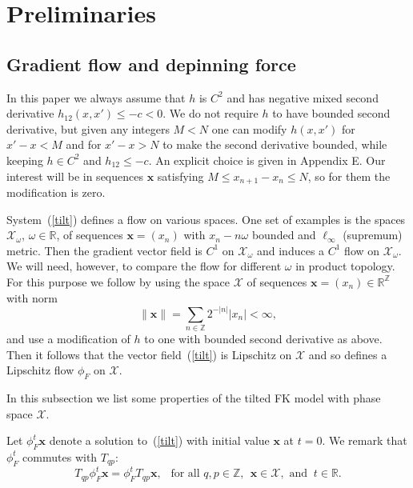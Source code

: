 \documentclass[12pt]{article}
\newcommand{\R}{\mathbb{R}}
\newcommand{\Z}{\mathbb{Z}}
\newcounter{number}
\newcommand{\begeq}{\begin{equation}}
\newcommand{\eeq}{\end{equation}}
\newcommand{\newsection}[1]{    \section{#1}
                               \setcounter{equation}{0}
                                \setcounter{number}{1} }
\newcommand{\refer}[1]{~(\ref{#1})}
\newcommand{\xbf}{{\mathbf{x}}}
\begin{document}

\newsection{Preliminaries}\label{sec:pre}
\subsection{Gradient flow and depinning force} \label{sec:gradflow}
In this paper we always assume that $h$ is $C^2$ and has negative mixed second derivative $h_{12}(x,x') \le -c < 0$.
We do not require $h$ to have bounded second derivative, but given any integers $M<N$ one can modify $h(x,x')$ for $x'-x<M$ and for $x'-x>N$ to make the second derivative bounded, while keeping $h\in C^2$ and $h_{12}\le -c$.  An explicit choice is given in  Appendix E.  Our interest will be in sequences $\xbf$ satisfying $M\le x_{n+1}-x_n\le N$, so for them the modification is zero.

System\refer{tilt} defines a flow on various spaces.  One set of examples is the spaces $\mathcal{X}_\omega$, $\omega \in \R$, of sequences $\xbf=(x_n)$ with $x_n - n\omega$ bounded and $\ell_\infty$ (supremum) metric.  Then the gradient vector field is $C^1$ on $\mathcal{X}_\omega$ and induces a $C^1$ flow on $\mathcal{X}_\omega$.  We will need, however, to compare the flow for different $\omega$ in product topology.  For this purpose we follow \cite{Go2,Q,QW1} by using the space $\mathcal{X}$ of sequences $\xbf=(x_n)\in\R^{\Z}$ with norm
$$
\|\xbf\|=\sum_{n\in \Z} 2^{-|n|} |x_n| < \infty,
$$
and use a modification of $h$ to one with bounded second derivative as above.
 Then it follows that the vector field\refer{tilt} is Lipschitz on $\mathcal{X}$ and so defines a Lipschitz flow $\phi_F$ on $\mathcal{X}$.

 In this subsection we list some properties of the tilted FK model with phase space $\mathcal{X}$.

 Let $\phi_F^t\xbf$ denote a solution to\refer{tilt} with initial value $\xbf$ at $t=0$.
We remark that $\phi_F^t$ commutes with $T_{qp}$:
 \begeq\label{commu}
 T_{qp}\phi_F^t\xbf=\phi_F^t T_{qp}\xbf,\ \ \mbox{ for all }
 q,p\in\Z, \ \ \xbf\in\mathcal{X}, \mbox{ and }\ t\in\R.
 \eeq
\end{document}
